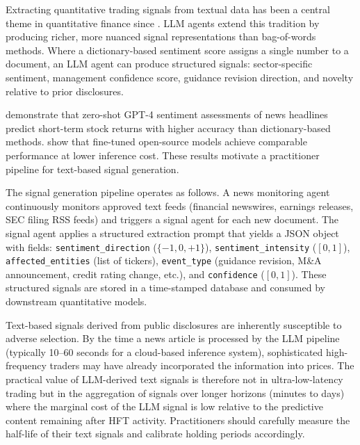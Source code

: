 \begin{context}
Extracting quantitative trading signals from textual data has been a central theme in
quantitative finance since \citet{tetlock2007giving}. LLM agents extend this tradition
by producing richer, more nuanced signal representations than bag-of-words methods.
Where a dictionary-based sentiment score assigns a single number to a document, an LLM
agent can produce structured signals: sector-specific sentiment, management confidence
score, guidance revision direction, and novelty relative to prior disclosures.

\citet{LopezLiraTang2023} demonstrate that zero-shot GPT-4 sentiment assessments of news
headlines predict short-term stock returns with higher accuracy than dictionary-based
methods. \citet{Yang2023} show that fine-tuned open-source models achieve
comparable performance at lower inference cost. These results motivate a practitioner
pipeline for text-based signal generation.

The signal generation pipeline operates as follows. A news monitoring agent
continuously monitors approved text feeds (financial newswires, earnings releases,
SEC filing RSS feeds) and triggers a signal agent for each new document. The signal
agent applies a structured extraction prompt that yields a JSON object with fields:
\texttt{sentiment\_direction} ($\{-1, 0, +1\}$), \texttt{sentiment\_intensity}
($[0, 1]$), \texttt{affected\_entities} (list of tickers), \texttt{event\_type}
(guidance revision, M\&A announcement, credit rating change, etc.), and
\texttt{confidence} ($[0, 1]$). These structured signals are stored in a time-stamped
database and consumed by downstream quantitative models.

\begin{remark}
\label{rem:signal-staleness}
Text-based signals derived from public disclosures are inherently susceptible to
adverse selection. By the time a news article is processed by the LLM pipeline
(typically 10--60 seconds for a cloud-based inference system), sophisticated high-frequency
traders may have already incorporated the information into prices. The practical
value of LLM-derived text signals is therefore not in ultra-low-latency trading but
in the aggregation of signals over longer horizons (minutes to days) where the
marginal cost of the LLM signal is low relative to the predictive content remaining
after HFT activity. Practitioners should carefully measure the half-life of their
text signals and calibrate holding periods accordingly.
\end{remark}

\end{context}


